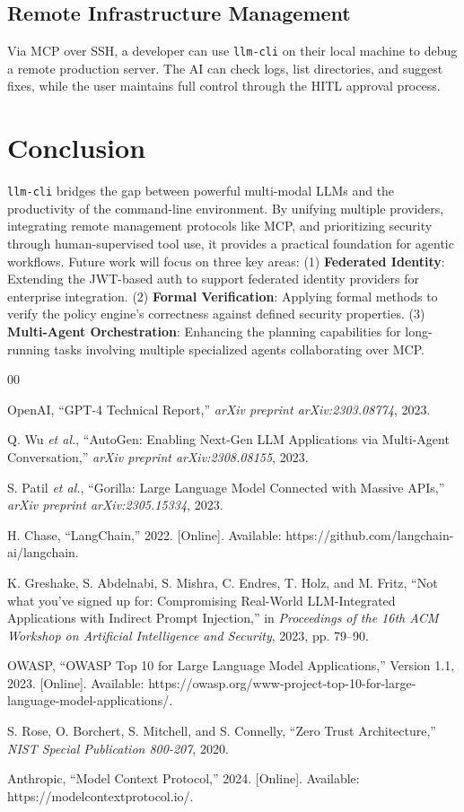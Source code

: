 \documentclass[conference]{IEEEtran}
\begin{document}
\subsection{Remote Infrastructure Management}
Via MCP over SSH, a developer can use \texttt{llm-cli} on their local machine to debug a remote production server. The AI can check logs, list directories, and suggest fixes, while the user maintains full control through the HITL approval process.

\section{Conclusion}
\texttt{llm-cli} bridges the gap between powerful multi-modal LLMs and the productivity of the command-line environment. By unifying multiple providers, integrating remote management protocols like MCP, and prioritizing security through human-supervised tool use, it provides a practical foundation for agentic workflows. Future work will focus on three key areas: (1) \textbf{Federated Identity}: Extending the JWT-based auth to support federated identity providers for enterprise integration. (2) \textbf{Formal Verification}: Applying formal methods to verify the policy engine's correctness against defined security properties. (3) \textbf{Multi-Agent Orchestration}: Enhancing the planning capabilities for long-running tasks involving multiple specialized agents collaborating over MCP.

\begin{thebibliography}{00}

 OpenAI, ``GPT-4 Technical Report,'' \textit{arXiv preprint arXiv:2303.08774}, 2023.

 Q. Wu \textit{et al.}, ``AutoGen: Enabling Next-Gen LLM Applications via Multi-Agent Conversation,'' \textit{arXiv preprint arXiv:2308.08155}, 2023.

 S. Patil \textit{et al.}, ``Gorilla: Large Language Model Connected with Massive APIs,'' \textit{arXiv preprint arXiv:2305.15334}, 2023.

 H. Chase, ``LangChain,'' 2022. [Online]. Available: https://github.com/langchain-ai/langchain.

 K. Greshake, S. Abdelnabi, S. Mishra, C. Endres, T. Holz, and M. Fritz, ``Not what you've signed up for: Compromising Real-World LLM-Integrated Applications with Indirect Prompt Injection,'' in \textit{Proceedings of the 16th ACM Workshop on Artificial Intelligence and Security}, 2023, pp. 79--90.

 OWASP, ``OWASP Top 10 for Large Language Model Applications,'' Version 1.1, 2023. [Online]. Available: https://owasp.org/www-project-top-10-for-large-language-model-applications/.

 S. Rose, O. Borchert, S. Mitchell, and S. Connelly, ``Zero Trust Architecture,'' \textit{NIST Special Publication 800-207}, 2020.

 Anthropic, ``Model Context Protocol,'' 2024. [Online]. Available: https://modelcontextprotocol.io/.

\end{thebibliography}
\end{document}
